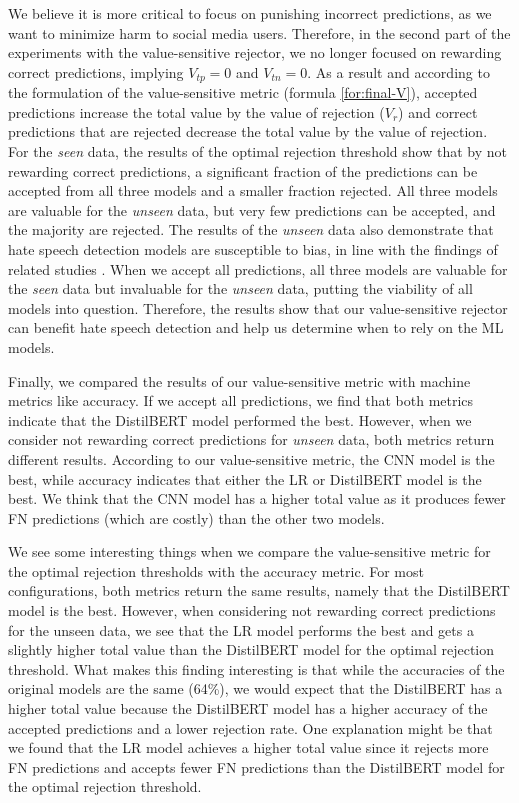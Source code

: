 %
We believe it is more critical to focus on punishing incorrect predictions, as we want to minimize harm to social media users.
%
Therefore, in the second part of the experiments with the value-sensitive rejector, we no longer focused on rewarding correct predictions, implying $V_{tp}=0$ and $V_{tn}=0$.
%
As a result and according to the formulation of the value-sensitive metric (formula \ref{for:final-V}), accepted predictions increase the total value by the value of rejection ($V_r$) and correct predictions that are rejected decrease the total value by the value of rejection.
%
For the \emph{seen} data, the results of the optimal rejection threshold show that by not rewarding correct predictions, a significant fraction of the predictions can be accepted from all three models and a smaller fraction rejected.
%
All three models are valuable for the \emph{unseen} data, but very few predictions can be accepted, and the majority are rejected.
%
The results of the \emph{unseen} data also demonstrate that hate speech detection models are susceptible to bias, in line with the findings of related studies \citep{arango2019hate,grondahl2018all}.
%
When we accept all predictions, all three models are valuable for the \emph{seen} data but invaluable for the \emph{unseen} data, putting the viability of all models into question.
%
Therefore, the results show that our value-sensitive rejector can benefit hate speech detection and help us determine when to rely on the ML models.
%

%
Finally, we compared the results of our value-sensitive metric with machine metrics like accuracy.
%
If we accept all predictions, we find that both metrics indicate that the DistilBERT model performed the best.
%
However, when we consider not rewarding correct predictions for \emph{unseen} data, both metrics return different results.
%
According to our value-sensitive metric, the CNN model is the best, while accuracy indicates that either the LR or DistilBERT model is the best.
%
We think that the CNN model has a higher total value as it produces fewer FN predictions (which are costly) than the other two models.
%

%
We see some interesting things when we compare the value-sensitive metric for the optimal rejection thresholds with the accuracy metric.
%
For most configurations, both metrics return the same results, namely that the DistilBERT model is the best.
%
However, when considering not rewarding correct predictions for the unseen data, we see that the LR model performs the best and gets a slightly higher total value than the DistilBERT model for the optimal rejection threshold.
%
What makes this finding interesting is that while the accuracies of the original models are the same (64\%), we would expect that the DistilBERT has a higher total value because the DistilBERT model has a higher accuracy of the accepted predictions and a lower rejection rate.
%
One explanation might be that we found that the LR model achieves a higher total value since it rejects more FN predictions and accepts fewer FN predictions than the DistilBERT model for the optimal rejection threshold.
%

